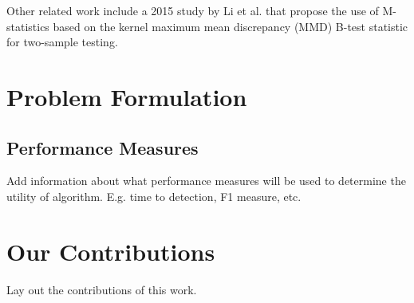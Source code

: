 Other related work include a 2015 study by Li et al. \cite{li2015m} that propose the use of M-statistics based on the kernel maximum mean discrepancy (MMD) B-test statistic for two-sample testing.



\section{Problem Formulation}



\subsection{Performance Measures}
Add information about what performance measures will be used to determine the utility of algorithm. E.g. time to detection, F1 measure, etc.

 

\section{Our Contributions}
Lay out the contributions of this work.